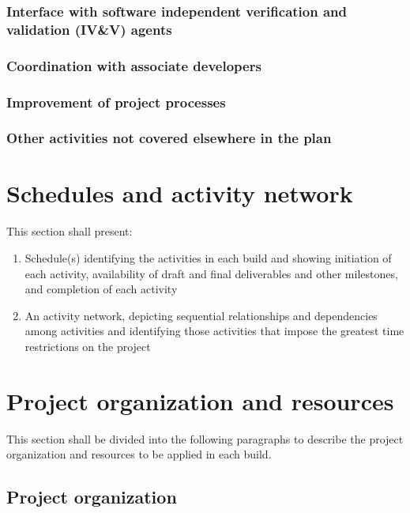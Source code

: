 \subsubsection{Interface with software independent verification and
validation (IV\&V) agents}

\subsubsection{Coordination with associate developers}

\subsubsection{Improvement of project processes}

\subsubsection{Other activities not covered elsewhere in the plan}

\section{Schedules and activity network}

This section shall present:

\begin{enumerate}
\itemsep1pt\parskip0pt
\item
  Schedule(s) identifying the activities in each build and showing
  initiation of each activity, availability of draft and final
  deliverables and other milestones, and completion of each activity
\item
  An activity network, depicting sequential relationships and
  dependencies among activities and identifying those activities that
  impose the greatest time restrictions on the project
\end{enumerate}

\section{Project organization and resources}

This section shall be divided into the following paragraphs to describe
the project organization and resources to be applied in each build.

\subsection{Project organization}

